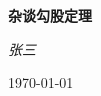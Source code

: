 \documentclass[nofonts]{ctexart}
\begin{document}
\begin{titlepage}
	\vspace*{\fill}
	\begin{center}
		\normalfont
		{\Huge\bfseries 杂谈勾股定理}

		\bigskip 
		{\Large\itshape 张三}

		\medskip 
		\today 
	\end{center}
\end{titlepage}
\end{document}
